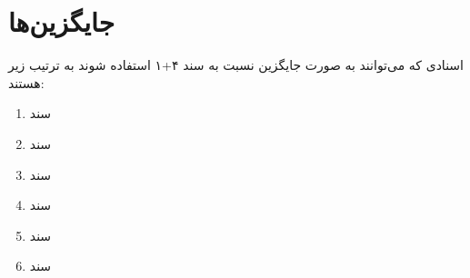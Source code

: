 \documentclass[a4paper]{article}
\begin{document}
\section*{جایگزین‌ها}

اسنادی که می‌توانند به صورت جایگزین نسبت به سند ۴+۱ استفاده شوند به ترتیب زیر
هستند:

\begin{enumerate}
    \item سند 
    \item سند 
    \item سند 
    \item سند 
    \item سند 
    \item سند 
\end{enumerate}



\end{document}
